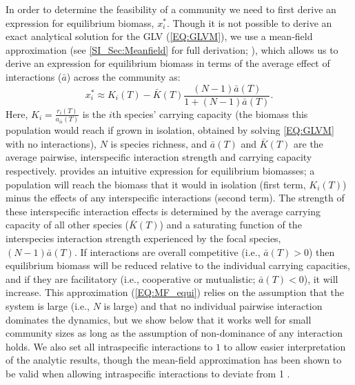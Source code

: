 \documentclass{article}
\begin{document}
In order to determine the feasibility of a community we need to first derive an expression for equilibrium biomass, $x^*_i$. Though it is not possible to derive an exact analytical solution for the GLV (\cref{EQ:GLVM}), we use a mean-field approximation (see \cref{SI_Sec:Meanfield} for full derivation;  \citet{Wilson2003,Wilson2004}), which allows us to derive an expression for equilibrium biomass in terms of the average effect of interactions ($\bar{a}$) across the community as: 
\begin{equation}\label{EQ:MF_equi}
  x^*_i \approx K_i(T) -  \bar{K}(T)  \frac{ (N-1)\bar{a}(T)}{1 + (N-1)\bar{a}(T)}. 
\end{equation}
Here, $K_i = \frac{r_i(T)}{a_{ii}(T)}$ is the $i$th species' carrying capacity (the biomass this population would reach if grown in isolation, obtained by solving \cref{EQ:GLVM} with no interactions), $N$ is species richness, and $\bar{a}(T)$ and $\bar{K}(T)$ are the average pairwise, interspecific interaction strength and carrying capacity respectively.  provides an intuitive expression for equilibrium biomasses; a population will reach the biomass that it would in isolation (first term, $K_i(T)$) minus the effects of any interspecific interactions (second term). The strength of these interspecific interaction effects is determined by the average carrying capacity of all other species ($\bar{K}(T)$) and a saturating function of the interspecies interaction strength experienced by the focal species, $(N-1)\bar{a}(T)$. If interactions are overall competitive (i.e., $\bar{a}(T) > 0$) then equilibrium biomass will be reduced relative to the individual carrying capacities, and if they are facilitatory (i.e., cooperative or mutualistic; $ \bar{a}(T) < 0$), it will increase. This approximation (\cref{EQ:MF_equi}) relies on the assumption that the system is large (i.e., $N$ is large) and that no individual pairwise interaction dominates the dynamics, but we show below that it works well for small community sizes as long as the assumption of non-dominance of any interaction holds. We also set all intraspecific interactions to $1$ to allow easier interpretation of the analytic results, though the mean-field approximation has been shown to be valid when allowing intraspecific interactions to deviate from 1 \citep{Wilson2004}. 
\end{document}
